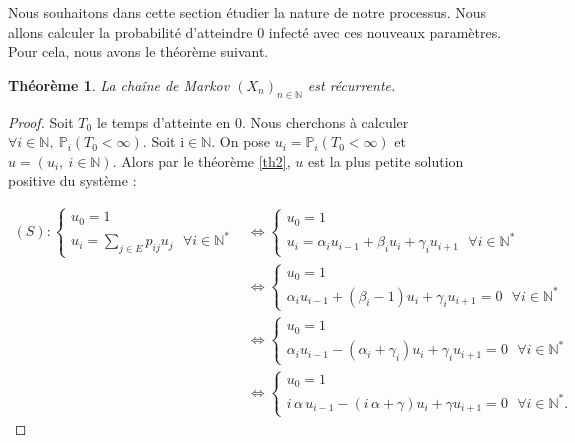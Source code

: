 \documentclass[12pt,a4paper]{report}
\newtheorem{thm}{Théorème}[section]
\theoremstyle{remark}
\begin{document}
Nous souhaitons dans cette section étudier la nature de notre processus. Nous allons calculer la probabilité d'atteindre $0$ infecté avec ces nouveaux paramètres. Pour cela, nous avons le théorème suivant.

\begin{thm}
La chaîne de Markov $(X_n)_{n \in \mathbb{N}}$ est récurrente.
\end{thm}
\begin{proof}
Soit $T_0$ le temps d'atteinte en $0$. Nous cherchons à calculer $\forall i\in \mathbb{N}, \ \mathbb{P}_i(T_0 < \infty)$. Soit i$\in\mathbb{N}$. On pose $u_i=\mathbb{P}_i(T_0 < \infty)$ et $u=(u_i,\  i\in \mathbb{N})$. Alors par le théorème \ref{th2}, $u$ est la plus petite solution  positive du système : 

\begin{align*}
(S) : \left\{
\begin{array}{ll}
        u_0=1\\
        u_i= \sum\limits_{j\in E} p_{ij}u_j \ \ \ \forall i \in \mathbb{N}^*
    \end{array}
\right.
&\Longleftrightarrow  \left\{
\begin{array}{ll}
        u_0=1\\
        u_i= \alpha_i u_{i-1} + \beta_i u_i + \gamma_i u_{i+1} \ \ \ \forall i \in \mathbb{N}^*
    \end{array}
\right.  \\
&\Longleftrightarrow \left\{
\begin{array}{ll}
        u_0=1\\
        \alpha_i u_{i-1} + (\beta_i-1) u_i + \gamma_i u_{i+1} = 0 \ \ \ \forall i \in \mathbb{N}^*
    \end{array}
\right.  \\
 &\Longleftrightarrow \left\{
\begin{array}{ll}
        u_0=1\\
        \alpha_i u_{i-1} - (\alpha_i+\gamma_i) u_i + \gamma_i u_{i+1} = 0 \ \ \ \forall i \in \mathbb{N}^*
    \end{array}
\right.  \\
 &\Longleftrightarrow \left\{
\begin{array}{ll}
        u_0=1\\
        i \, \alpha \, u_{i-1} - (i \, \alpha+\gamma) u_i + \gamma u_{i+1} = 0 \ \ \ \forall i \in \mathbb{N}^*.
    \end{array}
\right. 
\end{align*}


\end{proof}
\end{document}
